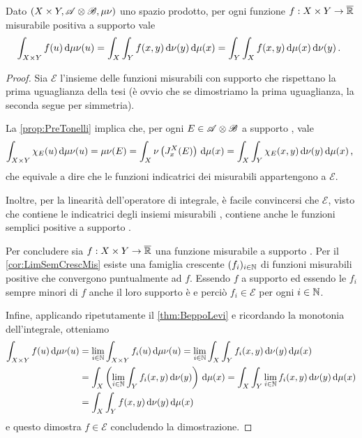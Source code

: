 \begin{theorem}[Tonelli]\label{thm:Tonelli}
	Dato $(X\times Y,\mathscr A\otimes\mathscr B,\mu\nu)$ uno spazio prodotto, per ogni funzione $f:X\times Y\to\overline{\mathbb R}$ misurabile positiva a supporto \sigfin[o] vale
	\begin{equation*}
		\int_{X\times Y}f(u)\,\mathrm d\mu\nu(u)=\int_X\int_Y f(x,y)\,\mathrm d\nu(y)\,\mathrm d\mu(x)=\int_Y\int_X f(x,y)\,\mathrm d\mu(x)\,\mathrm d\nu(y)\, \text{. }
	\end{equation*}
\end{theorem}
\begin{proof}
	\newcommand{\E}{\ensuremath{\mathscr E}}
	Sia $\E$ l'insieme delle funzioni misurabili con supporto \sigfin[o] che rispettano la prima uguaglianza della tesi (è ovvio che se dimostriamo la prima uguaglianza, la seconda segue per simmetria).
	
	La \cref{prop:PreTonelli} implica che, per ogni $E\in\mathscr A\otimes\mathscr B$ a supporto \sigfin[o], vale
	\begin{equation*}
		\int_{X\times Y}\chi_E(u)\,\mathrm d\mu\nu(u)=\mu\nu(E)=\int_X\nu\left(J_x^X(E)\right)\,\mathrm d\mu(x)=\int_X\int_Y\chi_E(x,y)\,\mathrm d\nu(y)\,\mathrm d\mu(x)\, \text{, }
	\end{equation*}
	che equivale a dire che le funzioni indicatrici dei misurabili \sigfin[i] appartengono a $\E$.
	
	Inoltre, per la linearità dell'operatore di integrale, è facile convincersi che $\E$, visto che contiene le indicatrici degli insiemi misurabili \sigfin[i], contiene anche le funzioni semplici positive a supporto \sigfin[o].
	
	Per concludere sia $f:X\times Y\to\overline{\mathbb R}$ una funzione misurabile a supporto \sigfin[o].
	Per il \cref{cor:LimSemCrescMis} esiste una famiglia crescente $(f_i)_{i\in\mathbb N}$ di funzioni misurabili positive che convergono puntualmente ad $f$. Essendo $f$ a supporto \sigfin[o] ed essendo le $f_i$ sempre minori di $f$ anche il loro supporto è \sigfin[o] e perciò $f_i\in\E$ per ogni $i\in\mathbb N$.
	
	Infine, applicando ripetutamente il \cref{thm:BeppoLevi} e ricordando la monotonia dell'integrale, otteniamo
	\begin{align*}
		\int_{X\times Y}f(u)\,\mathrm d\mu\nu(u)
		&=\lim_{i\in\mathbb N}\int_{X\times Y}f_i(u)\,\mathrm d\mu\nu(u)
		=\lim_{i\in\mathbb N}\int_X\int_Y f_i(x,y)\,\mathrm d\nu(y)\,\mathrm d\mu(x)\\
		&=\int_X\left(\lim_{i\in\mathbb N}\int_Y f_i(x,y)\,\mathrm d\nu(y)\right)\,\mathrm d\mu(x)
		=\int_X\int_Y\lim_{i\in\mathbb N} f_i(x,y)\,\mathrm d\nu(y)\,\mathrm d\mu(x)\\
		&=\int_X\int_Y f(x,y)\,\mathrm d\nu(y)\,\mathrm d\mu(x)
	\end{align*}
	e questo dimostra $f\in\E$ concludendo la dimostrazione.
\end{proof}

